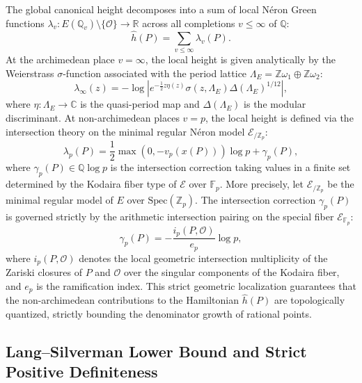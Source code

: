\documentclass[11pt,reqno]{article}
\theoremstyle{plain}
\theoremstyle{definition}
\begin{document}
The global canonical height decomposes into a sum of local Néron Green functions $\lambda_v: E(\mathbb{Q}_v) \setminus \{\mathcal{O}\} \to \mathbb{R}$ across all completions $v \le \infty$ of $\mathbb{Q}$:
\begin{equation}
    \label{eq:local_height_sum}
    \hat{h}(P) = \sum_{v \le \infty} \lambda_v(P).
\end{equation}
At the archimedean place $v = \infty$, the local height is given analytically by the Weierstrass $\sigma$-function associated with the period lattice $\Lambda_E = \mathbb{Z}\omega_1 \oplus \mathbb{Z}\omega_2$:
\begin{equation}
    \lambda_\infty(z) = -\log \left| e^{-\frac{1}{2} z \eta(z)} \sigma(z, \Lambda_E) \Delta(\Lambda_E)^{1/12} \right|,
\end{equation}
where $\eta: \Lambda_E \to \mathbb{C}$ is the quasi-period map and $\Delta(\Lambda_E)$ is the modular discriminant. At non-archimedean places $v = p$, the local height is defined via the intersection theory on the minimal regular Néron model $\mathcal{E}_{/\mathbb{Z}_p}$:
\begin{equation}
    \lambda_p(P) = \frac{1}{2} \max(0, -v_p(x(P))) \log p + \gamma_p(P),
\end{equation}
where $\gamma_p(P) \in \mathbb{Q} \log p$ is the intersection correction taking values in a finite set determined by the Kodaira fiber type of $\mathcal{E}$ over $\mathbb{F}_p$. More precisely, let $\mathcal{E}_{/\mathbb{Z}_p}$ be the minimal regular model of $E$ over $\mathrm{Spec}(\mathbb{Z}_p)$. The intersection correction $\gamma_p(P)$ is governed strictly by the arithmetic intersection pairing on the special fiber $\mathcal{E}_{\mathbb{F}_p}$:
\begin{equation}
    \gamma_p(P) = - \frac{i_p(P, \mathcal{O})}{e_p} \log p,
\end{equation}
where $i_p(P, \mathcal{O})$ denotes the local geometric intersection multiplicity of the Zariski closures of $P$ and $\mathcal{O}$ over the singular components of the Kodaira fiber, and $e_p$ is the ramification index. This strict geometric localization guarantees that the non-archimedean contributions to the Hamiltonian $\hat{h}(P)$ are topologically quantized, strictly bounding the denominator growth of rational points.

\subsection{Lang--Silverman Lower Bound and Strict Positive Definiteness}
\end{document}
